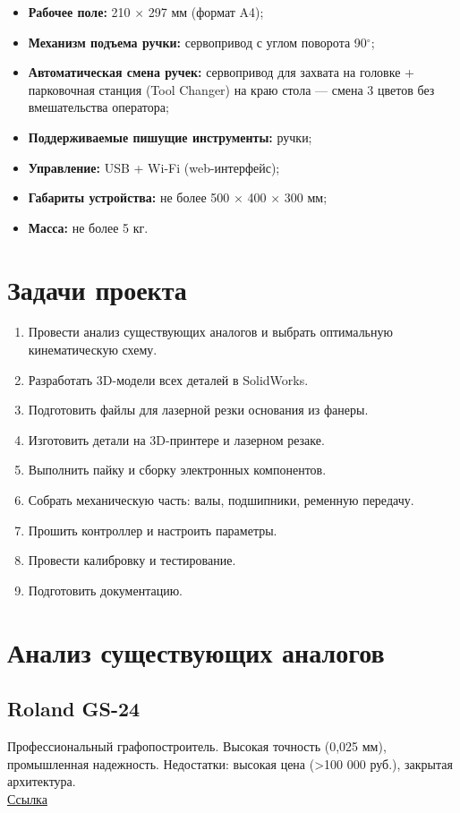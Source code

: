 \documentclass[a4paper,12pt]{article}
\begin{document}
\begin{itemize}[leftmargin=*]
	\item \textbf{Рабочее поле:} 210 $\times$ 297 мм (формат A4);
	\item \textbf{Механизм подъема ручки:} сервопривод с углом поворота 90$^\circ$;
	\item \textbf{Автоматическая смена ручек:} сервопривод для захвата на головке + парковочная станция (Tool Changer) на краю стола — смена 3 цветов без вмешательства оператора;
	\item \textbf{Поддерживаемые пишущие инструменты:} ручки;
	\item \textbf{Управление:} USB + Wi-Fi (web-интерфейс);
	\item \textbf{Габариты устройства:} не более 500 $\times$ 400 $\times$ 300 мм;
	\item \textbf{Масса:} не более 5 кг.
\end{itemize}
	
\section{Задачи проекта}
\begin{enumerate}[leftmargin=*]
	\item Провести анализ существующих аналогов и выбрать оптимальную кинематическую схему.
	\item Разработать 3D-модели всех деталей в SolidWorks.
	\item Подготовить файлы для лазерной резки основания из фанеры.
	\item Изготовить детали на 3D-принтере и лазерном резаке.
	\item Выполнить пайку и сборку электронных компонентов.
	\item Собрать механическую часть: валы, подшипники, ременную передачу.
	\item Прошить контроллер и настроить параметры.
	\item Провести калибровку и тестирование.
	\item Подготовить документацию.
\end{enumerate}
	
\section{Анализ существующих аналогов}
	
\subsection*{Roland GS-24}
Профессиональный графопостроитель. Высокая точность (0,025 мм), промышленная надежность. Недостатки: высокая цена (>100 000 руб.), закрытая архитектура.\\
\href{https://www.rolanddga.com/products/cutters/gs-24-camm-1-gs-series-desktop-cutter}{Ссылка}
	
\end{document}
